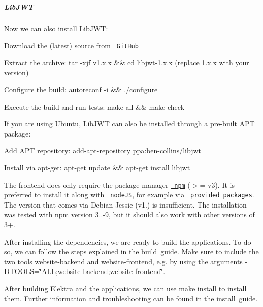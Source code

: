 \label{doc_tutorials_snippet-sharing-rest-service_md_autotoc_md2770}%
%
\subparagraph*{Lib\+J\+WT}

Now we can also install Lib\+J\+WT\+:


\begin{DoxyItemize}
\item Download the (latest) source from \href{https://github.com/benmcollins/libjwt/releases}{\texttt{ Git\+Hub}}
\item Extract the archive\+: {\ttfamily tar -\/xjf v1.\+x.\+x \&\& cd libjwt-\/1.\+x.\+x} (replace 1.\+x.\+x with your version)
\item Configure the build\+: {\ttfamily autoreconf -\/i \&\& ./configure}
\item Execute the build and run tests\+: {\ttfamily make all \&\& make check}
\end{DoxyItemize}

If you are using Ubuntu, Lib\+J\+WT can also be installed through a pre-\/built A\+PT package\+:


\begin{DoxyItemize}
\item Add A\+PT repository\+: {\ttfamily add-\/apt-\/repository ppa\+:ben-\/collins/libjwt}
\item Install via apt-\/get\+: {\ttfamily apt-\/get update \&\& apt-\/get install libjwt}
\end{DoxyItemize}

The frontend does only require the package manager \href{https://www.npmjs.com/}{\texttt{ npm}} ($>$= v3). It is preferred to install it along with \href{https://nodejs.org/}{\texttt{ node\+JS}}, for example via \href{https://nodejs.org/en/download/package-manager/}{\texttt{ provided packages}}. The version that comes via Debian Jessie (v1.) is insufficient. The installation was tested with npm version 3..-\/9, but it should also work with other versions of 3+.

After installing the dependencies, we are ready to build the applications. To do so, we can follow the steps explained in the \mbox{\hyperlink{doc_COMPILE_md}{build guide}}. Make sure to include the two tools {\ttfamily website-\/backend} and {\ttfamily website-\/frontend}, e.\+g. by using the arguments {\ttfamily -\/D\+T\+O\+O\+LS=\char`\"{}\+A\+L\+L;website-\/backend;website-\/frontend\char`\"{}}.

After building Elektra and the applications, we can use {\ttfamily make install} to install them. Further information and troubleshooting can be found in the \mbox{\hyperlink{doc_INSTALL_md}{install guide}}.

